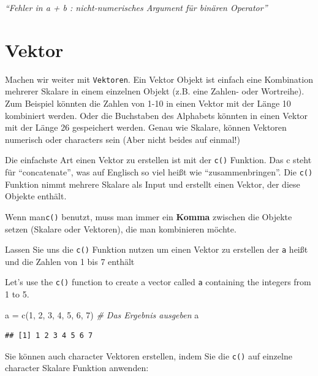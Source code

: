 \documentclass[
]{book}
\newenvironment{Shaded}{\begin{snugshade}}{\end{snugshade}}
\newcommand{\CommentTok}[1]{\textcolor[rgb]{0.56,0.35,0.01}{\textit{#1}}}
\newcommand{\DecValTok}[1]{\textcolor[rgb]{0.00,0.00,0.81}{#1}}
\newcommand{\FunctionTok}[1]{\textcolor[rgb]{0.00,0.00,0.00}{#1}}
\newcommand{\NormalTok}[1]{#1}
\newcommand{\OtherTok}[1]{\textcolor[rgb]{0.56,0.35,0.01}{#1}}
\begin{document}
\emph{``Fehler in a + b : nicht-numerisches Argument für binären Operator''}

\hypertarget{vektor}{%
\section{Vektor}\label{vektor}}

Machen wir weiter mit \texttt{Vektoren}. Ein Vektor Objekt ist einfach eine Kombination mehrerer Skalare in einem einzelnen Objekt (z.B. eine Zahlen- oder Wortreihe).
Zum Beispiel könnten die Zahlen von 1-10 in einen Vektor mit der Länge 10 kombiniert werden. Oder die Buchstaben des Alphabets könnten in einen Vektor mit der Länge 26 gespeichert werden. Genau wie Skalare, können Vektoren numerisch oder characters sein (Aber nicht beides auf einmal!)

Die einfachste Art einen Vektor zu erstellen ist mit der \texttt{c()} Funktion. Das c steht für ``concatenate'', was auf Englisch so viel heißt wie ``zusammenbringen''. Die \texttt{c()} Funktion nimmt mehrere Skalare als Input und erstellt einen Vektor, der diese Objekte enthält.

Wenn man\texttt{c()} benutzt, muss man immer ein \textbf{Komma} zwischen die Objekte setzen (Skalare oder Vektoren), die man kombinieren möchte.

Lassen Sie uns die \texttt{c()} Funktion nutzen um einen Vektor zu erstellen der \texttt{a} heißt und die Zahlen von 1 bis 7 enthält

Let's use the \texttt{c()} function to create a vector called \texttt{a} containing the integers from 1 to 5.

\begin{Shaded}
\begin{Highlighting}[]
\NormalTok{a }\OtherTok{=} \FunctionTok{c}\NormalTok{(}\DecValTok{1}\NormalTok{, }\DecValTok{2}\NormalTok{, }\DecValTok{3}\NormalTok{, }\DecValTok{4}\NormalTok{, }\DecValTok{5}\NormalTok{, }\DecValTok{6}\NormalTok{, }\DecValTok{7}\NormalTok{)}
\CommentTok{\# Das Ergebnis ausgeben}
\NormalTok{a}
\end{Highlighting}
\end{Shaded}

\begin{verbatim}
## [1] 1 2 3 4 5 6 7
\end{verbatim}

Sie können auch character Vektoren erstellen, indem Sie die \texttt{c()} auf einzelne character Skalare Funktion anwenden:
\end{document}
